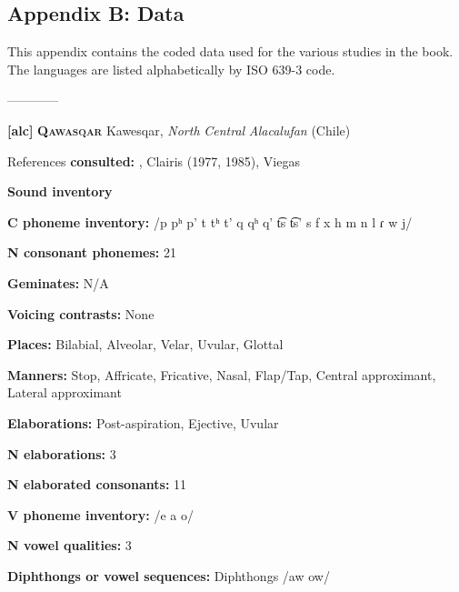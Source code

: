 

\subsection{Appendix B: Data}

This appendix contains the coded data used for the various studies in the book. The languages are listed alphabetically by ISO 639-3 code.



————



\textbf{[alc]}   \textbf{\textsc{Qawasqar}}  Kawesqar, \textit{North} \textit{Central} \textit{Alacalufan} (Chile)



References \textbf{consulted:} \citet{Aguilera2001}, Clairis (1977, 1985), Viegas \citet{Barros1990}



\textbf{Sound inventory}



\textbf{C phoneme inventory:} /p pʰ p’ t tʰ t’ q qʰ q’ t͡s t͡s’ s f x h m n l ɾ w j/



\textbf{N consonant phonemes:} 21



\textbf{Geminates:} N/A



\textbf{Voicing contrasts:} None



\textbf{Places:} Bilabial, Alveolar, Velar, Uvular, Glottal



\textbf{Manners:} Stop, Affricate, Fricative, Nasal, Flap/Tap, Central approximant, Lateral approximant



\textbf{Elaborations:} Post-aspiration, Ejective, Uvular



\textbf{N elaborations:} 3



\textbf{N elaborated consonants:} 11



\textbf{V phoneme inventory:} /e a o/



\textbf{N vowel qualities:} 3



\textbf{Diphthongs or vowel sequences:} Diphthongs /aw ow/



